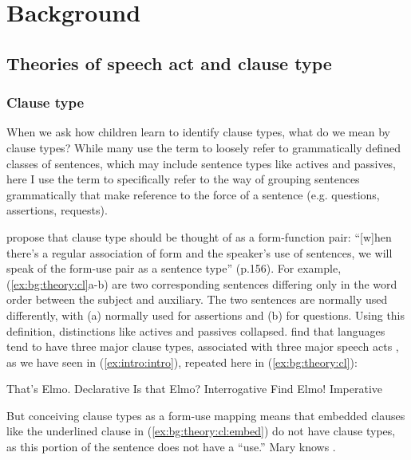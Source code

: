 \chapter{Background}
\label{chap:background}


\section{Theories of speech act and clause type} \label{sec:bg:theory}

\subsection{Clause type}
\label{sec:bg:theory:clause}
When we ask how children learn to identify clause types, what do we mean by clause types? While many use the term to loosely refer to grammatically defined classes of sentences, which may include sentence types like actives and passives, here I use the term to specifically refer to the way of grouping sentences grammatically that make reference to the force of a sentence (e.g. questions, assertions, requests). 

\cite{sz1985speechact} propose that clause type should be thought of as a form-function pair: ``[w]hen there's a regular association of form and the speaker's use of sentences, we will speak of the form-use pair as a sentence type'' (p.156). For example, (\ref{ex:bg:theory:cl}a-b) are two corresponding sentences differing only in the word order between the subject and auxiliary. The two sentences are normally used differently, with (a) normally used for assertions and (b) for questions.  Using this definition, distinctions like actives and passives collapsed. \textcite{sz1985speechact} find that languages tend to have three major clause types, \diis{} associated with three major speech acts \aqrs{}, as we have seen in (\ref{ex:intro:intro}), repeated here in (\ref{ex:bg:theory:cl}):

\bxl
That's Elmo. \hfill Declarative
\ex Is that Elmo? \hfill Interrogative
\ex Find Elmo! \hfill Imperative%
\exl
\eex




But conceiving clause types as a form-use mapping means that embedded clauses like the underlined clause in (\ref{ex:bg:theory:cl:embed}) do not have clause types, as this portion of the sentence does not have a ``use.''
Mary knows .
\eex


